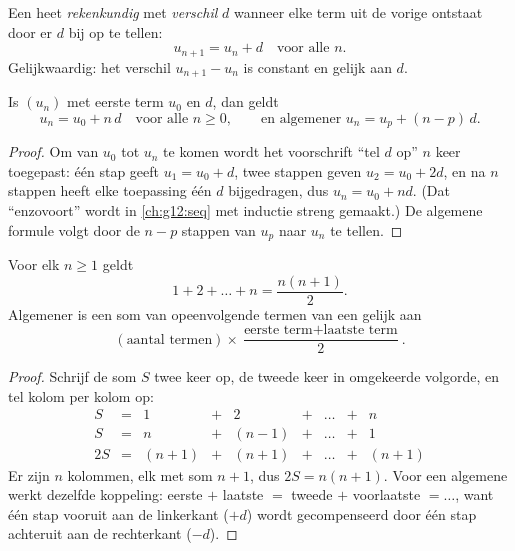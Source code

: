 \begin{definition}\label{def:g11:seq:arithmetic}
Een  heet \emph{rekenkundig} met
\emph{verschil} $d$ wanneer elke term uit de vorige ontstaat
door er $d$ bij op te tellen:
\[
u_{n+1} = u_n + d \quad \text{voor alle } n.
\]
Gelijkwaardig: het verschil $u_{n+1} - u_n$ is constant en gelijk aan $d$.
\end{definition}

\begin{theorem}\label{thm:g11:seq:arithgeneral}
Is $(u_n)$  met eerste term $u_0$ en  $d$, dan geldt
\[
u_n = u_0 + n\,d \quad \text{voor alle } n \geq 0,
\qquad\text{en algemener } u_n = u_p + (n - p)\,d .
\]
\end{theorem}

\begin{proof}
Om van $u_0$ tot $u_n$ te komen wordt het voorschrift ``tel $d$ op'' $n$ keer
toegepast: één stap geeft $u_1 = u_0 + d$, twee stappen geven
$u_2 = u_0 + 2d$, en na $n$ stappen heeft elke toepassing één $d$
bijgedragen, dus $u_n = u_0 + nd$. (Dat ``enzovoort'' wordt in
\cref{ch:g12:seq} met inductie streng gemaakt.) De algemene formule volgt door
de $n - p$ stappen van $u_p$ naar $u_n$ te tellen.
\end{proof}

\begin{theorem}\label{thm:g11:seq:intsum}
Voor elk  $n \geq 1$ geldt
\[
1 + 2 + \dots + n = \frac{n(n+1)}{2}.
\]
Algemener is een som van opeenvolgende termen van een  gelijk
aan
\[
(\text{aantal termen}) \times
\frac{\text{eerste term} + \text{laatste term}}{2}.
\]
\end{theorem}

\begin{proof}
Schrijf de som $S$ twee keer op, de tweede keer in omgekeerde volgorde, en
tel kolom per kolom op:
\[
\begin{array}{ccccccccc}
S & = & 1 & + & 2 & + & \dots & + & n\\
S & = & n & + & (n-1) & + & \dots & + & 1\\
\hline
2S & = & (n+1) & + & (n+1) & + & \dots & + & (n+1)
\end{array}
\]
Er zijn $n$ kolommen, elk met som $n + 1$, dus $2S = n(n+1)$. Voor een
algemene  werkt dezelfde koppeling: eerste $+$ laatste $=$
tweede $+$ voorlaatste $= \dots$, want één stap vooruit aan de linkerkant
($+d$) wordt gecompenseerd door één stap achteruit aan de rechterkant ($-d$).
\end{proof}

